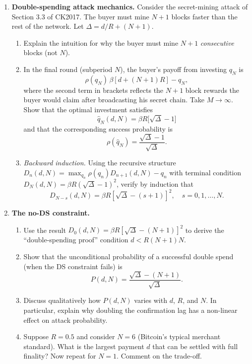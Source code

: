\documentclass[11pt]{article}
\begin{document}
\begin{enumerate}
\item \textbf{Double-spending attack mechanics.}
Consider the secret-mining attack of Section 3.3 of CK2017. The buyer must mine $N+1$ blocks
faster than the rest of the network. Let $\Delta = d/R + (N+1)$.
\begin{enumerate}
    \item Explain the intuition for why the buyer must mine $N+1$ \emph{consecutive} blocks
          (not $N$).
    \item In the final round (subperiod $N$), the buyer's payoff from investing $q_N$ is
          \[
              \rho(q_N)\,\beta[d + (N+1)R] - q_N,
          \]
          where the second term in brackets reflects the $N+1$ block rewards the buyer would
          claim after broadcasting his secret chain. Take $M\to\infty$. Show that the optimal
          investment satisfies
          \[
              \hat q_N(d,N) = \beta R\bigl[\sqrt\Delta - 1\bigr]
          \]
          and that the corresponding success probability is
          \[
              \rho(\hat q_N) = \frac{\sqrt\Delta - 1}{\sqrt\Delta}.
          \]
    \item \emph{Backward induction.} Using the recursive structure
          $D_n(d,N) = \max_{q_n}\rho(q_n)D_{n+1}(d,N) - q_n$ with terminal condition
          $D_N(d,N) = \beta R(\sqrt\Delta - 1)^2$, verify by induction that
          \[
              D_{N-s}(d,N) = \beta R[\sqrt\Delta - (s+1)]^2,\quad s=0,1,\ldots,N.
          \]
\end{enumerate}

\item \textbf{The no-DS constraint.}
\begin{enumerate}
    \item Use the result $D_0(d,N) = \beta R[\sqrt\Delta - (N+1)]^2$ to derive the
          ``double-spending proof'' condition $d < R(N+1)N$.
    \item Show that the unconditional probability of a successful double spend (when the
          DS constraint fails) is
          \[
              P(d,N) = \frac{\sqrt\Delta - (N+1)}{\sqrt\Delta}.
          \]
    \item Discuss qualitatively how $P(d,N)$ varies with $d$, $R$, and $N$. In particular,
          explain why doubling the confirmation lag has a non-linear effect on attack probability.
    \item Suppose $R = 0.5$ and consider $N=6$ (Bitcoin's typical merchant standard).
          What is the largest payment $d$ that can be settled with full finality? Now repeat
          for $N=1$. Comment on the trade-off.
\end{enumerate}


\end{enumerate}
\end{document}
